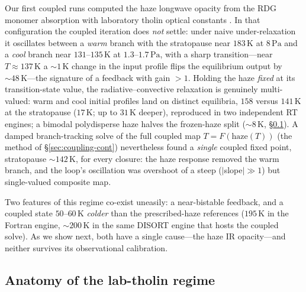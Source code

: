 \documentclass[11pt]{article}
\begin{document}
Our first coupled runs computed the haze longwave opacity from the RDG monomer
absorption with laboratory tholin optical constants \citep[][hereafter the
\emph{lab-tholin} configuration]{Khare1984}.  In that configuration the coupled
iteration does \emph{not} settle: under naive under-relaxation it oscillates
between a \emph{warm} branch with the stratopause near $183\,\mathrm{K}$ at
$8\,\mathrm{Pa}$ and a \emph{cool} branch near $131$--$135\,\mathrm{K}$ at
$1.3$--$1.7\,\mathrm{Pa}$, with a sharp transition---near
$T\approx137\,\mathrm{K}$ a $\sim\!1\,\mathrm{K}$ change in the input profile
flips the equilibrium output by $\sim\!48\,\mathrm{K}$---the signature of a
feedback with gain $>1$.  Holding the haze \emph{fixed} at its transition-state
value, the radiative--convective relaxation is genuinely multi-valued: warm and
cool initial profiles land on distinct equilibria, $158$ versus $141\,\mathrm{K}$
at the stratopause ($17\,\mathrm{K}$; up to $31\,\mathrm{K}$ deeper), reproduced
in two independent RT engines; a bimodal polydisperse haze halves the frozen-haze
split ($\sim\!8\,\mathrm{K}$, \S\ref{sec:coupling-diag}).  A damped
branch-tracking solve of the full coupled map $T=F(\mathrm{haze}(T))$ (the method
of \S\ref{sec:coupling-cont}) nevertheless found a \emph{single} coupled fixed
point, stratopause $\sim\!142\,\mathrm{K}$, for every closure: the haze response
removed the warm branch, and the loop's oscillation was overshoot of a steep
($|$slope$|\gg1$) but single-valued composite map.

Two features of this regime co-exist uneasily: a near-bistable feedback, and a
coupled state $50$--$60\,\mathrm{K}$ \emph{colder} than the prescribed-haze
references ($195\,\mathrm{K}$ in the Fortran engine, $\sim\!200\,\mathrm{K}$
in the same DISORT engine that hosts the coupled solve).  As we show next, both have a
single cause---the haze IR opacity---and neither survives its observational
calibration.

\subsection{Anatomy of the lab-tholin regime}
\label{sec:coupling-diag}
\end{document}
